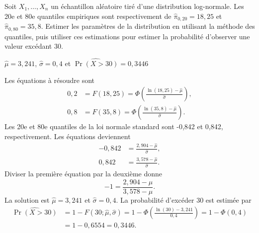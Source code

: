 
\begin{exercice}
Soit $X_1, \dots, X_n$ un échantillon aléatoire tiré d'une distribution log-normale. Les 20e et 80e quantiles empiriques sont respectivement de $\hat{\pi}_{0,20} = 18,25$ et $\hat{\pi}_{0,80} = 35,8$. Estimer les paramètres de la distribution en utilisant la méthode des quantiles, puis utiliser ces estimations pour estimer la probabilité d'observer une valeur excédant 30.

\begin{rep}
$\hat{\mu}=3,241$, $\hat{\sigma}=0,4$ et $\widehat{\Pr(X>30)}= 0,3446$
\end{rep}

\begin{sol}
Les équations à résoudre sont
\begin{align*}
0,2 &= F(18,25) = \Phi\left(\frac{\ln(18,25)-\hat{\mu}}{\hat{\sigma}}\right), \\
0,8 &= F(35,8) = \Phi\left(\frac{\ln(35,8)-\hat{\mu}}{\hat{\sigma}}\right).
\end{align*}
Les 20e et 80e quantiles de la loi normale standard sont -0,842 et 0,842, respectivement. Les équations deviennent
\begin{align*}
-0,842 &= \frac{2,904-\hat{\mu}}{\hat{\sigma}}, \\
0,842 &= \frac{3,578-\hat{\mu}}{\hat{\sigma}}.
\end{align*}
Diviser la première équation par la deuxième donne
$$
-1 = \frac{2,904-\hat{\mu}}{3,578-\hat{\mu}}.
$$
La solution est $\hat{\mu}=3,241$ et $\hat{\sigma}=0,4$. La probabilité d'excéder 30 est estimée par
\begin{align*}
\widehat{\Pr(X>30)} &= 1-F(30; \hat\mu,\hat\sigma) = 1-\Phi\left(\frac{\ln(30)-3,241}{0,4}\right) = 1-\Phi(0,4) \\
&= 1-0,6554 = 0,3446.
\end{align*}
\end{sol}
\end{exercice}

